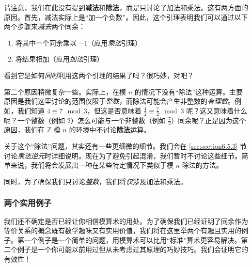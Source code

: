 \begin{remark}
    请注意，我们在此没有提到\textbf{减法}和\textbf{除法}，而是只讨论了加法和乘法。这有两方面的原因。首先，减法实际上是``加一个负数''。因此，这个引理表明我们可以通过以下两个步骤来\emph{减去}两个同余：
    \begin{enumerate}[label=(\arabic*)]
        \item 将其中一个同余乘以 $-1$（应用\emph{乘法}引理）
        \item 将结果相加（应用\emph{加法}引理）
    \end{enumerate}
    看到它是如何\emph{同时}利用这两个引理的结果了吗？很巧妙，对吧？

    第二个原因稍微复杂一些。实际上，在模 $n$ 的情况下没有``除法''这种运算。主要原因是我们这里讨论的范围仅限于\emph{整数}，而除法可能会产生非整数的\emph{有理数}。例如，我们知道 $4 \equiv 7 \mod 3$，但这是否意味着 $\frac{4}{2} \equiv \frac{7}{2} \mod 3$ 呢？这又意味着什么呢？一个整数（例如 $2$）怎么可能与一个非整数（例如 $\frac{7}{2}$）同余呢？正是因为这个原因，我们在 $\mathbb{Z}$ 模 $n$ 的环境中不讨论\textbf{除法}运算。

    关于这个``除法''问题，其实还有一些更细微的细节。我们会在 \ref{sec:section6.5.3} 节讨论\emph{乘法逆元}时详细说明。现在为了避免引起混淆，我们暂时不讨论这些细节。简单来说，我们将会发展出一种在某些特定情况下类似于模 $n$ 除法的方法。

    同时，为了确保我们只讨论\emph{整数}，我们将\emph{仅}涉及加法和乘法。
\end{remark}

\subsubsection*{两个实用例子}

我们还不确定是否已经让你相信模算术的用处。为了确保我们已经证明了同余作为等价关系的概念既有数学趣味又有实用价值，我们将在这里举两个有趣且实用的例子。第一个例子是一个简单的问题，用模算术可以比用``标准''算术更容易解决。第二个例子是一个你可能以前用过但从未考虑过其原理的巧妙技巧。我们会证明它的有效性！\\ \\


